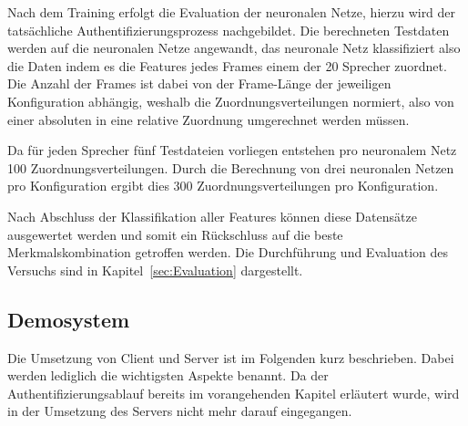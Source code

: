 Nach dem Training erfolgt die Evaluation der neuronalen Netze, hierzu wird der tatsächliche Authentifizierungsprozess nachgebildet.
Die berechneten Testdaten werden auf die neuronalen Netze angewandt, das neuronale Netz klassifiziert also die Daten indem es die Features jedes Frames einem der 20 Sprecher zuordnet.
Die Anzahl der Frames ist dabei von der Frame-Länge der jeweiligen Konfiguration abhängig, weshalb die Zuordnungsverteilungen normiert, also von einer absoluten in eine relative Zuordnung umgerechnet werden müssen.

Da für jeden Sprecher fünf Testdateien vorliegen entstehen pro neuronalem Netz 100 Zuordnungsverteilungen.
Durch die Berechnung von drei neuronalen Netzen pro Konfiguration ergibt dies 300 Zuordnungsverteilungen pro Konfiguration.

Nach Abschluss der Klassifikation aller Features können diese Datensätze ausgewertet werden und somit ein Rückschluss auf die beste Merkmalskombination getroffen werden.
Die Durchführung und Evaluation des Versuchs sind in Kapitel~\ref{sec:Evaluation} dargestellt.

\subsection{Demosystem} 
Die Umsetzung von Client und Server ist im Folgenden kurz beschrieben.
Dabei werden lediglich die wichtigsten Aspekte benannt.
Da der Authentifizierungsablauf bereits im vorangehenden Kapitel erläutert wurde, wird in der Umsetzung des Servers nicht mehr darauf eingegangen.

